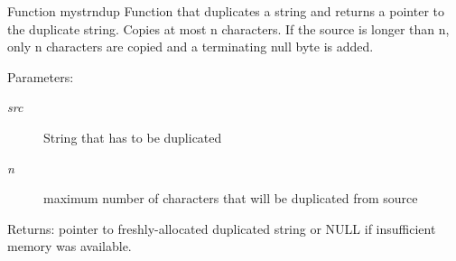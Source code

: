 Function mystrndup Function that duplicates a string and returns a pointer to the duplicate string. Copies at most n characters. If the source is longer than n, only n characters are copied and a terminating null byte is added. \begin{Desc}
\item[Parameters:]
\begin{description}
\item[{\em src}]String that has to be duplicated \item[{\em n}]maximum number of characters that will be duplicated from source \end{description}
\end{Desc}
\begin{Desc}
\item[Returns:]pointer to freshly-allocated duplicated string or NULL if insufficient memory was available. \end{Desc}
